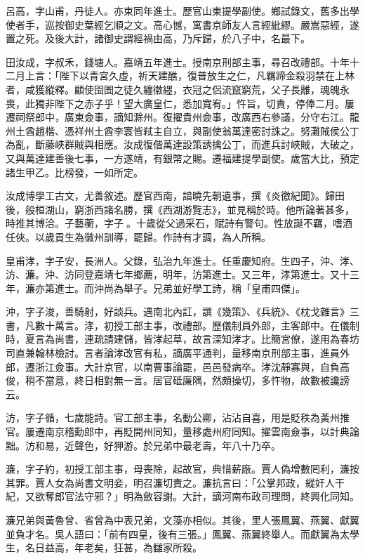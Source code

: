\begin{pinyinscope}
呂高，字山甫，丹徒人。亦束同年進士。歷官山東提學副使。鄉試錄文，舊多出學使者手，巡按御史葉經乞順之文。高心憾，寓書京師友人言經紕繆。嚴嵩惡經，遂置之死。及後大計，諸御史謂經禍由高，乃斥歸，於八子中，名最下。

田汝成，字叔禾，錢塘人。嘉靖五年進士。授南京刑部主事，尋召改禮部。十年十二月上言：「陛下以青宮久虛，祈天建醮，復普放生之仁，凡羈蹄金殺羽禁在上林者，咸獲縱釋。顧使囹圄之徒久纏徽纆，衣冠之侶流竄窮荒，父子長離，魂魄永喪，此獨非陛下之赤子乎！望大廣皇仁，悉加寬宥。」忤旨，切責，停俸二月。屢遷祠祭郎中，廣東僉事，謫知滁州。復擢貴州僉事，改廣西右參議，分守右江。龍州土酋趙楷、憑祥州土酋李寰皆弒主自立，與副使翁萬達密討誅之。努灘賊侯公丁為亂，斷藤峽群賊與相應。汝成復偕萬達設策誘擒公丁，而進兵討峽賊，大破之，又與萬達建善後七事，一方遂靖，有銀幣之賜。遷福建提學副使。歲當大比，預定諸生甲乙。比榜發，一如所定。

汝成博學工古文，尤善敘述。歷官西南，諳曉先朝遺事，撰《炎徼紀聞》。歸田後，般桓湖山，窮浙西諸名勝，撰《西湖游覽志》，並見稱於時。他所論著甚多，時推其博洽。子藝蘅，字子。十歲從父過采石，賦詩有警句。性放誕不羈，嗜酒任俠。以歲貢生為徽州訓導，罷歸。作詩有才調，為人所稱。

皇甫涍，字子安，長洲人。父錄，弘治九年進士。任重慶知府。生四子，沖、涍、汸、濂。沖、汸同登嘉靖七年鄉薦，明年，汸第進士。又三年，涍第進士。又十三年，濂亦第進士。而沖尚為舉子。兄弟並好學工詩，稱「皇甫四傑」。

沖，字子浚，善騎射，好談兵。遇南北內訌，譔《幾策》、《兵統》、《枕戈雜言》三書，凡數十萬言。涍，初授工部主事，改禮部。歷儀制員外郎，主客郎中。在儀制時，夏言為尚書，連疏請建儲，皆涍起草，故言深知涍才。比簡宮僚，遂用為春坊司直兼翰林檢討。言者論涍改官有私，謫廣平通判，量移南京刑部主事，進員外郎，遷浙江僉事。大計京官，以南曹事論罷，邑邑發病卒。涍沈靜寡與，自負高俊，稍不當意，終日相對無一言。居官砥廉隅，然頗操切，多忤物，故數被讒謗云。

汸，字子循，七歲能詩。官工部主事，名動公卿，沾沾自喜，用是貶秩為黃州推官。屢遷南京稽勳郎中，再貶開州同知，量移處州府同知。擢雲南僉事，以計典論黜。汸和易，近聲色，好狎游。於兄弟中最老壽，年八十乃卒。

濂，字子約，初授工部主事，母喪除，起故官，典惜薪廠。賈人偽增數罔利，濂按其罪。賈人女為尚書文明妾，明召濂切責之。濂抗言曰：「公掌邦政，縱奸人干紀，又欲奪郎官法守邪？」明為斂容謝。大計，謫河南布政司理問，終興化同知。

濂兄弟與黃魯曾、省曾為中表兄弟，文藻亦相似。其後，里人張鳳翼、燕翼、獻翼並負才名。吳人語曰：「前有四皇，後有三張。」鳳翼、燕翼終舉人。而獻翼為太學生，名日益高，年老矣，狂甚，為讎家所殺。


\end{pinyinscope}
